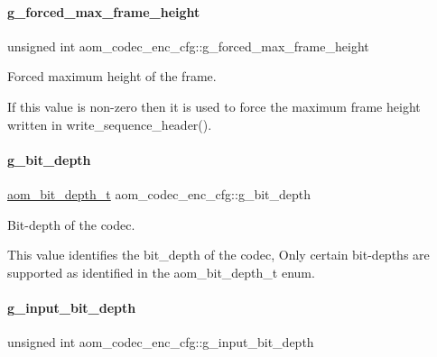 \paragraph{\texorpdfstring{g\+\_\+forced\+\_\+max\+\_\+frame\+\_\+height}{g\_forced\_max\_frame\_height}}
{\footnotesize\ttfamily unsigned int aom\+\_\+codec\+\_\+enc\+\_\+cfg\+::g\+\_\+forced\+\_\+max\+\_\+frame\+\_\+height}



Forced maximum height of the frame. 

If this value is non-\/zero then it is used to force the maximum frame height written in write\+\_\+sequence\+\_\+header(). \mbox{\label{structaom__codec__enc__cfg_a76a27f44cded1516803a776a0a7e9038}} 
\paragraph{\texorpdfstring{g\+\_\+bit\+\_\+depth}{g\_bit\_depth}}
{\footnotesize\ttfamily \hyperlink{group__codec_ga90c2026e798a669241dc57464472a198}{aom\+\_\+bit\+\_\+depth\+\_\+t} aom\+\_\+codec\+\_\+enc\+\_\+cfg\+::g\+\_\+bit\+\_\+depth}



Bit-\/depth of the codec. 

This value identifies the bit\+\_\+depth of the codec, Only certain bit-\/depths are supported as identified in the aom\+\_\+bit\+\_\+depth\+\_\+t enum. \mbox{\label{structaom__codec__enc__cfg_a021aed8496604b1ad3af2c51f52d075d}} 
\paragraph{\texorpdfstring{g\+\_\+input\+\_\+bit\+\_\+depth}{g\_input\_bit\_depth}}
{\footnotesize\ttfamily unsigned int aom\+\_\+codec\+\_\+enc\+\_\+cfg\+::g\+\_\+input\+\_\+bit\+\_\+depth}



